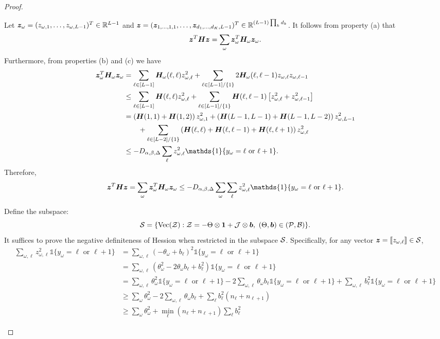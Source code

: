 \documentclass{article}
\theoremstyle{plain}
\theoremstyle{definition}
\begin{document}
\begin{proof}
\begin{enumerate}
Let $\bm{z}_\omega=(z_{\omega,1},\ldots,z_{\omega,L-1})^T\in\mathbb{R}^{L-1}$ and $\bm{z}=(\bm{z}_{1,\ldots,1,1},\ldots,\bm{z}_{d_1,\ldots,d_K,L-1})^T\in\mathbb{R}^{(L-1)\prod_k d_k}$. It follows from property (a) that
\[
\bm{z}^T\bm{H}\bm{z} =\sum_{\omega}\bm{z}_\omega^T \bm{H}_{\omega} \bm{z}_\omega.
\]
Furthermore, from properties (b) and (c) we have
\begin{align}
\mz_\omega^T \mH_{\omega} \mz_\omega &=
\sum_{\ell\in[L-1]}\mH_\omega(\ell,\ell)z_{\omega,\ell}^2+\sum_{\ell\in[L-1]/\{1\}}2\mH_{\omega}(\ell,\ell-1)z_{\omega,\ell}z_{\omega,\ell-1}\\
&\leq \sum_{\ell\in[L-1]}\mH(\ell,\ell)z^2_{\omega,\ell}+\sum_{\ell\in[L-1]/\{1\}}\mH(\ell,\ell-1)\left[z_{\omega,\ell}^2+z_{\omega,\ell-1}^2\right]\\
&= \left(\mH(1,1)+\mH(1,2)\right)z_{\omega,1}^2+ \left(\mH(L-1,L-1)+\mH(L-1,L-2)\right)z_{\omega,L-1}^2\\&\quad\quad+\sum_{\ell\in[L-2]/\{1\}}\left(\mH(\ell,\ell)+\mH(\ell,\ell-1)+\mH(\ell,\ell+1)\right)z_{\omega,\ell}^2\\
& \leq -D_{\alpha,\beta,\Delta} \sum_{\ell}z^2_{\omega,\ell}\mathds{1}\{y_\omega=\ell \text{ or }\ell+1\}.
\end{align}
Therefore,
\begin{equation}\label{eq:sum}
\mz^T\mH\mz =\sum_{\omega}\mz_\omega^T \mH_{\omega} \mz_\omega \leq -D_{\alpha,\beta,\Delta}\sum_{\omega}\sum_{\ell} z^2_{\omega,\ell}\mathds{1}\{y_\omega=\ell \text{ or }\ell+1\}.
\end{equation}


Define the subspace:
\[
\tS=\{\Vec(\tZ): \tZ=-\Theta\otimes \mathbf{1}+\tJ\otimes \mb,\ (\Theta,\mb)\in(\tP,\tB)\}.
\]
It suffices to prove the negative definiteness of Hession when restricted in the subspace $\mathcal{S}$. Specifically, for any vector $\bm{z}=\llbracket z_{\omega,\ell} \rrbracket\in\mathcal{S}$,
\begin{align}
\sum_{\omega,\ell} z^2_{\omega,\ell}\mathds{1}\{y_\omega=\ell \text{ or }\ell+1\}&=\sum_{\omega,\ell}(-\theta_\omega+b_\ell)^2\mathds{1}\{y_\omega=\ell \text{ or }\ell+1\}\\
&=\sum_{\omega,\ell}(\theta^2_\omega-2\theta_\omega b_\ell + b^2_\ell)\mathds{1}\{y_\omega=\ell \text{ or }\ell+1\}\\
&=\sum_{\omega,\ell}\theta^2_\omega\mathds{1}\{y_\omega=\ell \text{ or }\ell+1\}-2\sum_{\omega,\ell} \theta_\omega b_\ell \mathds{1}\{y_\omega=\ell \text{ or }\ell+1\}+\sum_{\omega,\ell}b^2_\ell\mathds{1}\{y_\omega=\ell \text{ or }\ell+1\}\\
&\geq \sum_{\omega}\theta^2_\omega -2\sum_{\omega,\ell}\theta_\omega b_\ell+\sum_{\ell}b_\ell^2\left(n_{\ell}+n_{\ell+1}\right)\\
&\geq \sum_{\omega}\theta^2_\omega+\min_\ell\left(n_{\ell}+n_{\ell+1}\right)\sum_{\ell}b_\ell^2
\end{align}


\end{enumerate}
\end{proof}
\end{document}
